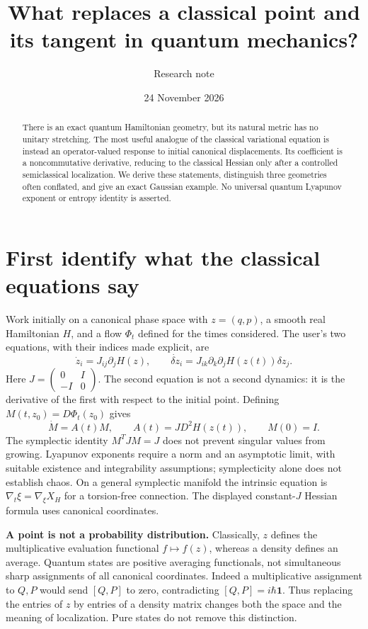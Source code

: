 \documentclass[11pt,a4paper]{article}
\title{What replaces a classical point and its tangent in quantum mechanics?}
\author{Research note}
\date{24 November 2026}
\newcommand{\id}{\mathbf{1}}
\begin{document}
\maketitle
\begin{abstract}
There is an exact quantum Hamiltonian geometry, but its natural metric has no unitary stretching. The most useful analogue of the classical variational equation is instead an operator-valued response to initial canonical displacements. Its coefficient is a noncommutative derivative, reducing to the classical Hessian only after a controlled semiclassical localization. We derive these statements, distinguish three geometries often conflated, and give an exact Gaussian example. No universal quantum Lyapunov exponent or entropy identity is asserted.
\end{abstract}

\section{First identify what the classical equations say}
Work initially on a canonical phase space with $z=(q,p)$, a smooth real Hamiltonian $H$, and a flow $\Phi_t$ defined for the times considered. The user's two equations, with their indices made explicit, are
\[\dot z_i=J_{ij}\partial_jH(z),\qquad\dot{\delta z}_i=J_{ik}\partial_k\partial_jH(z(t))\delta z_j.\]
Here $J=\left(\begin{smallmatrix}0&I\\-I&0\end{smallmatrix}\right)$. The second equation is not a second dynamics: it is the derivative of the first with respect to the initial point. Defining $M(t,z_0)=D\Phi_t(z_0)$ gives
\[\dot M=A(t)M,\qquad A(t)=JD^2H(z(t)),\qquad M(0)=I.\]
The symplectic identity $M^TJM=J$ does not prevent singular values from growing. Lyapunov exponents require a norm and an asymptotic limit, with suitable existence and integrability assumptions; symplecticity alone does not establish chaos. On a general symplectic manifold the intrinsic equation is $\nabla_t\xi=\nabla_\xi X_H$ for a torsion-free connection. The displayed constant-$J$ Hessian formula uses canonical coordinates.

\textbf{A point is not a probability distribution.} Classically, $z$ defines the multiplicative evaluation functional $f\mapsto f(z)$, whereas a density defines an average. Quantum states are positive averaging functionals, not simultaneous sharp assignments of all canonical coordinates. Indeed a multiplicative assignment to $Q,P$ would send $[Q,P]$ to zero, contradicting $[Q,P]=i\hbar\id$. Thus replacing the entries of $z$ by entries of a density matrix changes both the space and the meaning of localization. Pure states do not remove this distinction.
\end{document}
